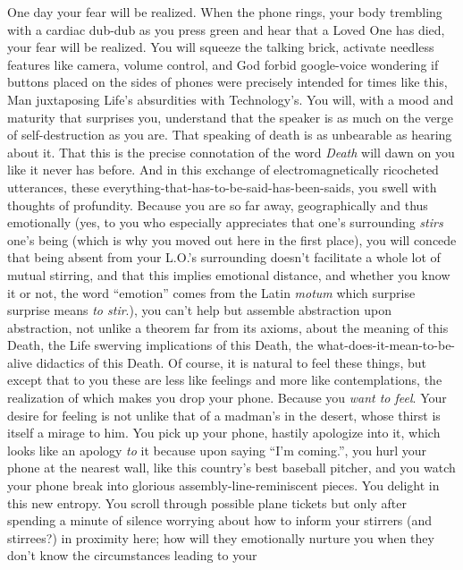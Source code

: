 \documentclass{article}
\begin{document}
\newline

One day your fear will be realized. When the phone rings, your body
trembling with a cardiac dub-dub as you press green and hear that
a Loved One has died, your fear will be realized. You will squeeze the
talking brick, activate needless features like camera, volume control,
and God forbid google-voice wondering if buttons placed on the sides of
phones were precisely intended for times like this, Man juxtaposing
Life's absurdities with Technology's. You will, with a mood and maturity
that surprises you, understand that the speaker is as much on the verge
of self-destruction as you are. That speaking of death is as unbearable
as hearing about it. That this is the precise connotation of the word
\textit{Death} will dawn on you like it never has before. And in this
exchange of electromagnetically ricocheted utterances, these
everything-that-has-to-be-said-has-been-saids, you swell with thoughts
of profundity. Because you are so far away, geographically and thus
emotionally (yes, to you who especially appreciates that one's
surrounding \textit{stirs} one's being (which is why you moved out here
in the first place), you will concede that being absent from your L.O.'s
surrounding doesn't facilitate a whole lot of mutual stirring, and that
this implies emotional distance, and whether you know it or not, the
word ``emotion'' comes from the Latin \textit{motum} which surprise
surprise means \textit{to stir}.), you can't help but assemble
abstraction upon abstraction, not unlike a theorem far from its axioms,
about the meaning of this Death, the Life swerving implications of this
Death, the what-does-it-mean-to-be-alive didactics of this Death. Of
course, it is natural to feel these things, but except that to you these
are less like feelings and more like contemplations, the realization of
which makes you drop your phone. Because you \textit{want to feel}. Your
desire for feeling is not unlike that of a madman's in the desert,
whose thirst is itself a mirage to him. You pick up your phone, hastily
apologize into it, which looks like an apology \textit{to} it because
upon saying ``I'm coming.'', you hurl your phone at the nearest wall,
like this country's best baseball pitcher, and you watch your phone
break into glorious assembly-line-reminiscent pieces. You delight in
this new entropy. You scroll through possible plane tickets but only
after spending a minute of silence worrying about how to inform your
stirrers (and stirrees?) in proximity here; how will they emotionally
nurture you when they don't know the circumstances leading to your
\end{document}
